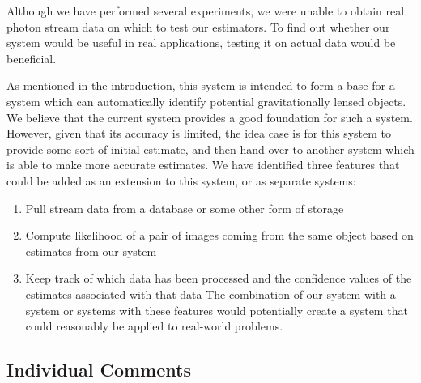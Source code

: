 \documentclass[a4paper,11pt]{article}
\begin{document}
   Although we have performed several experiments, we were unable to obtain real
   photon stream data on which to test our estimators. To find out whether our
   system would be useful in real applications, testing it on actual data would be
   beneficial.

   As mentioned in the introduction, this system is intended to form a base for a
   system which can automatically identify potential gravitationally lensed
   objects. We believe that the current system provides a good foundation for such
   a system. However, given that its accuracy is limited, the idea case is for this
   system to provide some sort of initial estimate, and then hand over to another
   system which is able to make more accurate estimates. We have identified three
   features that could be added as an extension to this system, or as separate
   systems:
\begin{enumerate}
\item Pull stream data from a database or some other form of storage
\item Compute likelihood of a pair of images coming from the same object based on
   estimates from our system
\item Keep track of which data has been processed and the confidence
   values of the estimates associated with that data
   The combination of our system with a system or systems with these features would
   potentially create a system that could reasonably be applied to real-world problems.
\end{enumerate}
\subsection{Individual Comments}
\label{sec-9-2}
\end{document}
